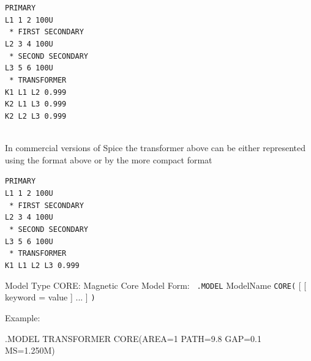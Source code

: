 \documentclass{article}
\begin{document}
\index
      \parbox{2.5in}{
      \tt  * PRIMARY\\
           L1 1 2 100U\\
    \  * FIRST SECONDARY\\
       L2 3 4 100U\\
    \  * SECOND SECONDARY\\
       L3 5 6 100U\\
    \  * TRANSFORMER\\
       K1 L1 L2 0.999\\
       K2 L1 L3 0.999\\
       K2 L2 L3 0.999}\\

In commercial versions of Spice the transformer above can be either represented using
the format above or by the more
compact format\\

\index
      \parbox{2.5in}{
      \tt  * PRIMARY\\
           L1 1 2 100U\\
    \  * FIRST SECONDARY\\
       L2 3 4 100U\\
    \  * SECOND SECONDARY\\
       L3 5 6 100U\\
    \  * TRANSFORMER\\
       K1 L1 L2 L3 0.999}
\newline

Model Type {CORE}: {Magnetic Core Model}
Form: {\tt
.MODEL} ModelName {\tt CORE(} [  [ keyword = value ]  ... ]
{\tt )}

\medskip
\noindent
Example:

\noindent
.MODEL TRANSFORMER CORE(AREA=1 PATH=9.8 GAP=0.1 MS=1.250M)
\end{document}
